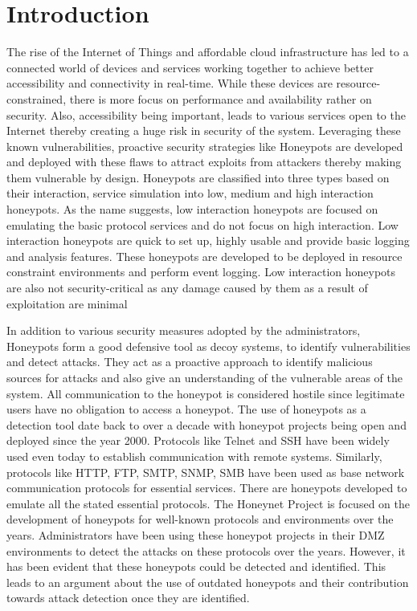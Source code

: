 \section{Introduction}

The rise of the Internet of Things and affordable cloud infrastructure has led to a connected world of devices and services working together to achieve better accessibility and connectivity in real-time. While these devices are resource-constrained, there is more focus on performance and availability rather on security. Also, accessibility being important, leads to various services open to the Internet thereby creating a huge risk in security of the system. Leveraging these known vulnerabilities, proactive security strategies like Honeypots are developed and deployed with these flaws to attract exploits from attackers thereby making them vulnerable by design. Honeypots are classified into three types based on their interaction, service simulation into low, medium and high interaction honeypots. As the name suggests, low interaction honeypots are focused on emulating the basic protocol services and do not focus on high interaction. Low interaction honeypots are quick to set up, highly usable and provide basic logging and analysis features. These honeypots are developed to be deployed in resource constraint environments and perform event logging. Low interaction honeypots are also not security-critical as any damage caused by them as a result of exploitation are minimal 

In addition to various security measures adopted by the administrators, Honeypots form a good defensive tool as decoy systems, to identify vulnerabilities and detect attacks. They act as a proactive approach to identify malicious sources for attacks and also give an understanding of the vulnerable areas of the system. All communication to the honeypot is considered hostile since legitimate users have no obligation to access a honeypot. The use of honeypots as a detection tool date back to over a decade with honeypot projects being open and deployed since the year 2000. Protocols like Telnet and SSH have been widely used even today to establish communication with remote systems. Similarly, protocols like HTTP, FTP, SMTP, SNMP, SMB have been used as base network communication protocols for essential services. There are honeypots developed to emulate all the stated essential protocols. The Honeynet Project \cite{Honeynet} is focused on the development of honeypots for well-known protocols and environments over the years. Administrators have been using these honeypot projects in their DMZ environments to detect the attacks on these protocols over the years. However, it has been evident that these honeypots could be detected and identified. This leads to an argument about the use of outdated honeypots \cite{counting} and their contribution towards attack detection once they are identified.

